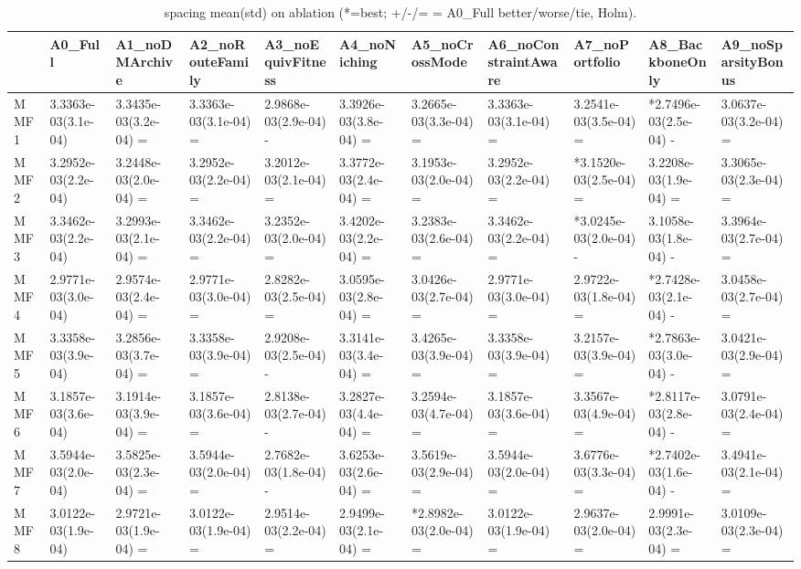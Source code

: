 \begin{table}[t]
\centering
\caption{spacing mean(std) on ablation (*=best; +/-/= = A0_Full better/worse/tie, Holm).}
\label{tab:ablation_spacing}
\begin{tabular}{lllllllllll}
\toprule
 & A0\_Full & A1\_noDMArchive & A2\_noRouteFamily & A3\_noEquivFitness & A4\_noNiching & A5\_noCrossMode & A6\_noConstraintAware & A7\_noPortfolio & A8\_BackboneOnly & A9\_noSparsityBonus \\
\midrule
MMF1 & 3.3363e-03(3.1e-04) & 3.3435e-03(3.2e-04) = & 3.3363e-03(3.1e-04) = & 2.9868e-03(2.9e-04) - & 3.3926e-03(3.8e-04) = & 3.2665e-03(3.3e-04) = & 3.3363e-03(3.1e-04) = & 3.2541e-03(3.5e-04) = & *2.7496e-03(2.5e-04) - & 3.0637e-03(3.2e-04) = \\
MMF2 & 3.2952e-03(2.2e-04) & 3.2448e-03(2.0e-04) = & 3.2952e-03(2.2e-04) = & 3.2012e-03(2.1e-04) = & 3.3772e-03(2.4e-04) = & 3.1953e-03(2.0e-04) = & 3.2952e-03(2.2e-04) = & *3.1520e-03(2.5e-04) = & 3.2208e-03(1.9e-04) = & 3.3065e-03(2.3e-04) = \\
MMF3 & 3.3462e-03(2.2e-04) & 3.2993e-03(2.1e-04) = & 3.3462e-03(2.2e-04) = & 3.2352e-03(2.0e-04) = & 3.4202e-03(2.2e-04) = & 3.2383e-03(2.6e-04) = & 3.3462e-03(2.2e-04) = & *3.0245e-03(2.0e-04) - & 3.1058e-03(1.8e-04) - & 3.3964e-03(2.7e-04) = \\
MMF4 & 2.9771e-03(3.0e-04) & 2.9574e-03(2.4e-04) = & 2.9771e-03(3.0e-04) = & 2.8282e-03(2.5e-04) = & 3.0595e-03(2.8e-04) = & 3.0426e-03(2.7e-04) = & 2.9771e-03(3.0e-04) = & 2.9722e-03(1.8e-04) = & *2.7428e-03(2.1e-04) - & 3.0458e-03(2.7e-04) = \\
MMF5 & 3.3358e-03(3.9e-04) & 3.2856e-03(3.7e-04) = & 3.3358e-03(3.9e-04) = & 2.9208e-03(2.5e-04) - & 3.3141e-03(3.4e-04) = & 3.4265e-03(3.9e-04) = & 3.3358e-03(3.9e-04) = & 3.2157e-03(3.9e-04) = & *2.7863e-03(3.0e-04) - & 3.0421e-03(2.9e-04) = \\
MMF6 & 3.1857e-03(3.6e-04) & 3.1914e-03(3.9e-04) = & 3.1857e-03(3.6e-04) = & 2.8138e-03(2.7e-04) - & 3.2827e-03(4.4e-04) = & 3.2594e-03(4.7e-04) = & 3.1857e-03(3.6e-04) = & 3.3567e-03(4.9e-04) = & *2.8117e-03(2.8e-04) - & 3.0791e-03(2.4e-04) = \\
MMF7 & 3.5944e-03(2.0e-04) & 3.5825e-03(2.3e-04) = & 3.5944e-03(2.0e-04) = & 2.7682e-03(1.8e-04) - & 3.6253e-03(2.6e-04) = & 3.5619e-03(2.9e-04) = & 3.5944e-03(2.0e-04) = & 3.6776e-03(3.3e-04) = & *2.7402e-03(1.6e-04) - & 3.4941e-03(2.1e-04) = \\
MMF8 & 3.0122e-03(1.9e-04) & 2.9721e-03(1.9e-04) = & 3.0122e-03(1.9e-04) = & 2.9514e-03(2.2e-04) = & 2.9499e-03(2.1e-04) = & *2.8982e-03(2.0e-04) = & 3.0122e-03(1.9e-04) = & 2.9637e-03(2.0e-04) = & 2.9991e-03(2.3e-04) = & 3.0109e-03(2.3e-04) = \\
\bottomrule
\end{tabular}
\end{table}
